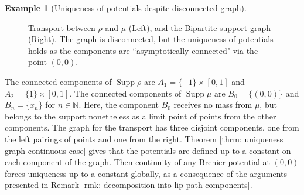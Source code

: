 \documentclass[11pt, oneside, titlepage]{book}
\theoremstyle{plain}
\theoremstyle{definition}
\newtheorem{example}[theorem]{Example}
\newcommand{\N}{\mathbb{N}}
\DeclareMathOperator{\supp}{Supp}
\begin{document}
\begin{example}[Uniqueness of potentials despite disconnected graph]
\begin{figure}[h]
\begin{minipage}{0.48\linewidth}
    \end{minipage}

    \caption{Transport between $\rho$ and $\mu$ (Left), and the Bipartite support graph (Right). The graph is disconnected, but the uniqueness of potentials holds as the components are ``asymptotically connected" via the point $(0, 0)$.}
    \label{fig: disconnected graph preserves uniqueness of potentials}
\end{figure}
The connected components of $\supp \rho$ are $A_1 = \{-1\} \times [0, 1]$ and $A_2 = \{1\} \times [0, 1]$. The connected components of $\supp \mu$ are $B_0 = \{(0, 0)\}$ and $B_n = \{x_n\}$ for $n \in \N$. Here, the component $B_0$ receives no mass from $\mu$, but belongs to the support nonetheless as a limit point of points from the other components. The graph for the transport has three disjoint components, one from the left pairings of points and one from the right. Theorem \ref{thrm: uniqueness graph continuous case} gives that the potentials are defined up to a constant on each component of the graph. Then continuity of any Brenier potential at $(0, 0)$ forces uniqueness up to a constant globally, as a consequence of the arguments presented in Remark \ref{rmk: decomposition into lip path components}.
\end{example}
\end{document}
